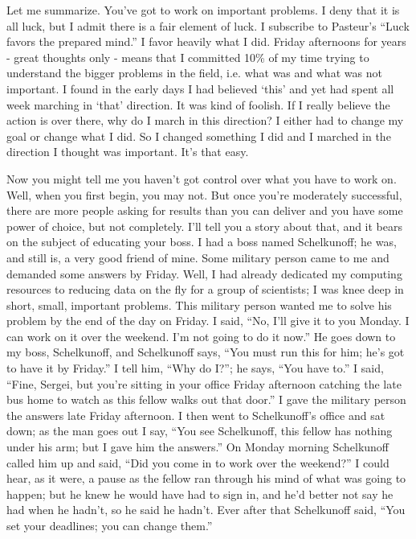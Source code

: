 \documentclass{article}
\begin{document}
Let me summarize. You've got to work on important problems. I deny that it is all luck, but I admit there is a fair element of luck. I subscribe to Pasteur's ``Luck favors the prepared mind.'' I favor heavily what I did. Friday afternoons for years - great thoughts only - means that I committed 10\% of my time trying to understand the bigger problems in the field, i.e. what was and what was not important. I found in the early days I had believed `this' and yet had spent all week marching in `that' direction. It was kind of foolish. If I really believe the action is over there, why do I march in this direction? I either had to change my goal or change what I did. So I changed something I did and I marched in the direction I thought was important. It's that easy.

Now you might tell me you haven't got control over what you have to work on. Well, when you first begin, you may not. But once you're moderately successful, there are more people asking for results than you can deliver and you have some power of choice, but not completely. I'll tell you a story about that, and it bears on the subject of educating your boss. I had a boss named Schelkunoff; he was, and still is, a very good friend of mine. Some military person came to me and demanded some answers by Friday. Well, I had already dedicated my computing resources to reducing data on the fly for a group of scientists; I was knee deep in short, small, important problems. This military person wanted me to solve his problem by the end of the day on Friday. I said, ``No, I'll give it to you Monday. I can work on it over the weekend. I'm not going to do it now.'' He goes down to my boss, Schelkunoff, and Schelkunoff says, ``You must run this for him; he's got to have it by Friday.'' I tell him, ``Why do I?''; he says, ``You have to.'' I said, ``Fine, Sergei, but you're sitting in your office Friday afternoon catching the late bus home to watch as this fellow walks out that door.'' I gave the military person the answers late Friday afternoon. I then went to Schelkunoff's office and sat down; as the man goes out I say, ``You see Schelkunoff, this fellow has nothing under his arm; but I gave him the answers.'' On Monday morning Schelkunoff called him up and said, ``Did you come in to work over the weekend?'' I could hear, as it were, a pause as the fellow ran through his mind of what was going to happen; but he knew he would have had to sign in, and he'd better not say he had when he hadn't, so he said he hadn't. Ever after that Schelkunoff said, ``You set your deadlines; you can change them.''
\end{document}

